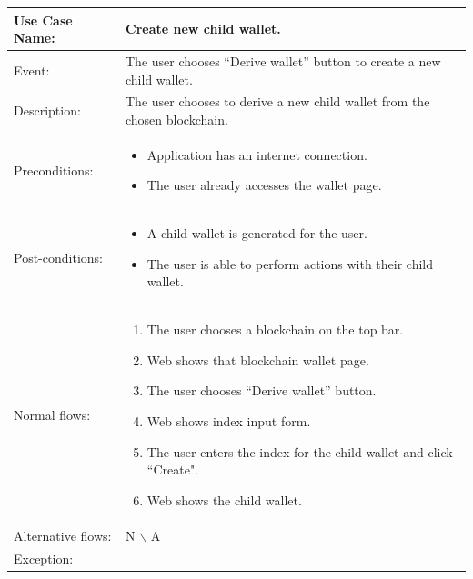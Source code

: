 \begin{table}[]
    \begin{tabular}{m{4cm} m{11cm} }
        \toprule
        Use Case Name:     & Create new child wallet.                                                  \\ 
        \midrule 
        Event:             & The user chooses “Derive wallet” button to create a new child wallet.     \\ 
        \midrule 
        Description:       & The user chooses to derive a new child wallet from the chosen blockchain. \\ 
        \midrule 
        Preconditions:     & \begin{itemize}
            \item Application has an internet connection.
            \item The user already accesses the wallet page.
        \end{itemize}                                                \\ 
        \midrule 
        Post-conditions:   & \begin{itemize}
            \item A child wallet is generated for the user.
            \item The user is able to perform actions with their child wallet.
        \end{itemize}                                                \\ 
        \midrule 
        Normal flows:      & \begin{enumerate}
            \item The user chooses a blockchain on the top bar.
            \item Web shows that blockchain wallet page.
            \item The user chooses “Derive wallet” button.
            \item Web shows index input form.
            \item The user enters the index for the child wallet and click ``Create".
            \item Web shows the child wallet.
        \end{enumerate}                                                \\ 
        \midrule 
        Alternative flows: & N $\backslash$ A                                                          \\ 
        \midrule 
        Exception:         & \begin{itemize}

\end{itemize}
\end{tabular}
\end{table}
